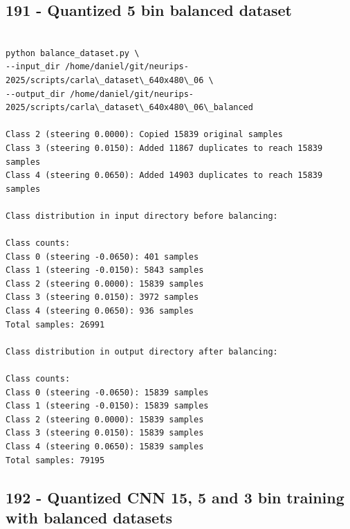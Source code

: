 \subsection{191 - Quantized 5 bin balanced dataset}
\label{app_res:191}

\begin{verbatim}

python balance_dataset.py \
--input_dir /home/daniel/git/neurips-2025/scripts/carla\_dataset\_640x480\_06 \
--output_dir /home/daniel/git/neurips-2025/scripts/carla\_dataset\_640x480\_06\_balanced

Class 2 (steering 0.0000): Copied 15839 original samples
Class 3 (steering 0.0150): Added 11867 duplicates to reach 15839 samples
Class 4 (steering 0.0650): Added 14903 duplicates to reach 15839 samples

Class distribution in input directory before balancing:

Class counts:
Class 0 (steering -0.0650): 401 samples
Class 1 (steering -0.0150): 5843 samples
Class 2 (steering 0.0000): 15839 samples
Class 3 (steering 0.0150): 3972 samples
Class 4 (steering 0.0650): 936 samples
Total samples: 26991

Class distribution in output directory after balancing:

Class counts:
Class 0 (steering -0.0650): 15839 samples
Class 1 (steering -0.0150): 15839 samples
Class 2 (steering 0.0000): 15839 samples
Class 3 (steering 0.0150): 15839 samples
Class 4 (steering 0.0650): 15839 samples
Total samples: 79195

\end{verbatim}

\subsection{192 - Quantized CNN 15, 5 and 3 bin training with balanced datasets}
\label{app_res:192}

